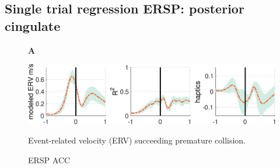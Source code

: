 
\subsection{Single trial regression ERSP: posterior cingulate}

\begin{figure}[h]
  \begin{flushleft}\textbf{A}\end{flushleft}
  \includegraphics[width=\textwidth]{figures/vel_mocap_1.eps}
  \label{vel_erp_mismatch}
  \caption{Event-related velocity (ERV) succeeding premature collision.}
\end{figure}

\begin{figure}[h]
  \centering
  \caption{ERSP ACC}
\end{figure}
